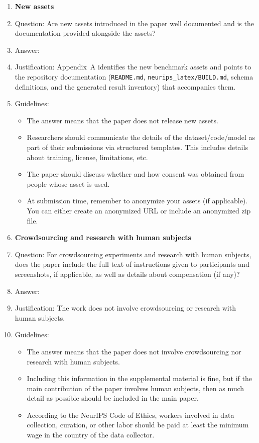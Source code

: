 \documentclass{article}
\begin{document}
\begin{enumerate}
\item {\bf New assets}
    \item[] Question: Are new assets introduced in the paper well documented and is the documentation provided alongside the assets?
    \item[] Answer: \answerYes{}
    \item[] Justification: Appendix~A identifies the new benchmark assets and points to the repository documentation (\texttt{README.md}, \texttt{neurips\_latex/BUILD.md}, schema definitions, and the generated result inventory) that accompanies them.
    \item[] Guidelines:
    \begin{itemize}
        \item The answer \answerNA{} means that the paper does not release new assets.
        \item Researchers should communicate the details of the dataset\slash code\slash model as part of their submissions via structured templates. This includes details about training, license, limitations, etc.
        \item The paper should discuss whether and how consent was obtained from people whose asset is used.
        \item At submission time, remember to anonymize your assets (if applicable). You can either create an anonymized URL or include an anonymized zip file.
    \end{itemize}

\item {\bf Crowdsourcing and research with human subjects}
    \item[] Question: For crowdsourcing experiments and research with human subjects, does the paper include the full text of instructions given to participants and screenshots, if applicable, as well as details about compensation (if any)?
    \item[] Answer: \answerNA{}
    \item[] Justification: The work does not involve crowdsourcing or research with human subjects.
    \item[] Guidelines:
    \begin{itemize}
        \item The answer \answerNA{} means that the paper does not involve crowdsourcing nor research with human subjects.
        \item Including this information in the supplemental material is fine, but if the main contribution of the paper involves human subjects, then as much detail as possible should be included in the main paper.
        \item According to the NeurIPS Code of Ethics, workers involved in data collection, curation, or other labor should be paid at least the minimum wage in the country of the data collector.
    \end{itemize}


\end{enumerate}
\end{document}
